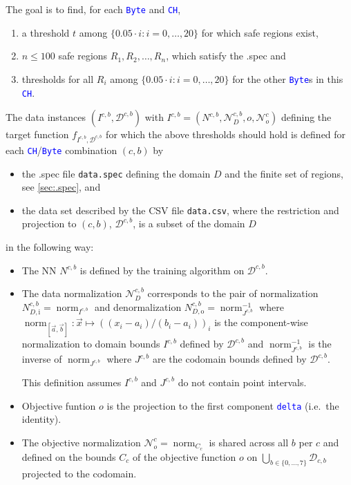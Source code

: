 \documentclass[a4paper,parskip=half]{article} %
\newcommand*\cmdstyle\texttt
\newcommand*\file\cmdstyle
\newcommand*\literalColor{blue}
\newcommand*\literal[1]{\textcolor{\literalColor}{\cmdstyle{#1}}}
\begin{document}
{The goal is to find, for each \literal{Byte} and \literal{CH},
\begin{enumerate}
\def\labelenumi{(\alph{enumi})}
\item a threshold $t$ among $\{0.05\cdot i:i=0,\ldots,20\}$ for which safe
	regions exist,
\item $n\leq 100$ safe regions $R_1,R_2,\ldots,R_n$, which satisfy the .spec and
\item thresholds for all $R_i$ among $\{0.05\cdot i:i=0,\ldots,20\}$ for the
	other \literal{Byte}s in this \literal{CH}.
\end{enumerate}
The data instances $(I^{c,b},\mathcal D^{c,b})$ with
$I^{c,b}=(N^{c,b},\mathcal N_D^{c,b},o,\mathcal N_o^c)$
defining the target function $f_{I^{c,b},\mathcal D^{c,b}}$ for which the
above thresholds should hold is defined for each \literal{CH}/\literal{Byte}
combination $(c,b)$ by
\begin{itemize}
\item the .spec file \file{data.spec} defining the domain $D$
	and the finite set of regions, see \cref{sec:.spec}, and
\item the data set
	described by the CSV file \file{data.csv}, where
	the restriction and projection to $(c,b)$, $\mathcal D^{c,b}$,
	is a subset of the domain $D$
\end{itemize}
in the following way:
\begin{itemize}
\item
	The NN $N^{c,b}$ is defined by the training algorithm on
	$\mathcal D^{c,b}$.
\item
	The data normalization $\mathcal N_D^{c,b}$ corresponds to the pair of
	normalization $N_{D,\mathrm i}^{c,b}=\operatorname{norm}_{I^{c,b}}$
	and denormalization
	$N_{D,\mathrm o}^{c,b}=\operatorname{norm}_{J^{c,b}}^{-1}$ where
	$\operatorname{norm}_{[\vec a,\vec b]}:\vec x\mapsto ((x_i-a_i)/(b_i-a_i))_i$
	is the component-wise normalization to domain bounds $I^{c,b}$
	defined by $\mathcal D^{c,b}$
	and $\operatorname{norm}_{J^{c,b}}^{-1}$ is the inverse of
	$\operatorname{norm}_{J^{c,b}}$
	where $J^{c,b}$ are the codomain bounds defined by $\mathcal D^{c,b}$.

	This definition assumes $I^{c,b}$ and $J^{c,b}$ do not contain
	point intervals.
\item
	Objective funtion $o$ is the projection to the first component
	\literal{delta} (i.e.\ the identity).
\item
	The objective normalization $\mathcal N_o^c=\operatorname{norm}_{C_c}$
	is shared across all $b$ per $c$ and defined on the bounds $C_c$ of the
	objective function $o$ on $\bigcup_{b\in\{0,\ldots,7\}}\mathcal D_{c,b}$
	projected to the codomain.
\end{itemize}

}
\end{document}
